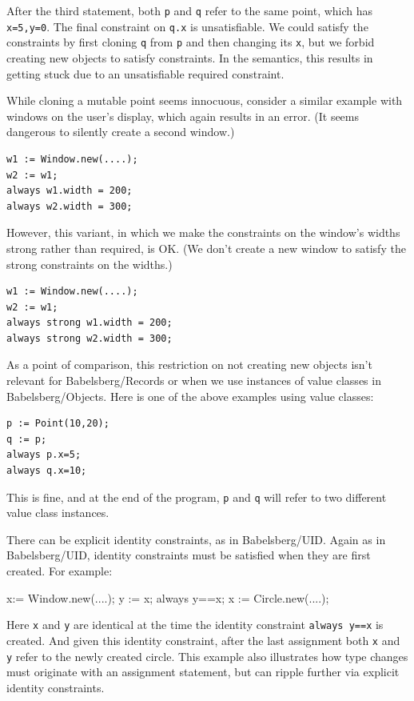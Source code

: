 \documentclass{article}
\newcounter{examples}
\begin{document}
After the third statement, both \verb|p| and \verb|q| refer to the
same point, which has \verb|x=5,y=0|.  The final constraint on 
\verb|q.x| is unsatisfiable.  We could satisfy the constraints by
first cloning \verb|q| from \verb|p| and then changing its \verb|x|,
but we forbid creating new objects to satisfy constraints.  In the
semantics, this results in getting stuck due to an unsatisfiable
required constraint.

While cloning a mutable point seems innocuous, consider a similar example with
windows on the user's display, which again results in an error.  (It
seems dangerous to silently create a second window.)

\begin{verbatim}
w1 := Window.new(....);
w2 := w1;
always w1.width = 200;
always w2.width = 300;
\end{verbatim}

However, this variant, in which we make the constraints on the
window's widths strong rather than required, is OK.  (We don't create
a new window to satisfy the strong constraints on the widths.)

\begin{verbatim}
w1 := Window.new(....);
w2 := w1;
always strong w1.width = 200;
always strong w2.width = 300;
\end{verbatim}

As a point of comparison, this restriction on not creating new objects
isn't relevant for Babelsberg/Records or when we use instances of
value classes in Babelsberg/Objects.
Here is one of the above examples using value classes:

\begin{verbatim}
p := Point(10,20);
q := p;
always p.x=5;
always q.x=10;
\end{verbatim}

This is fine, and at the end of the program, \verb|p| and \verb|q|
will refer to two different value class instances.

There can be explicit identity constraints, as in Babelsberg/UID\@.
Again as in Babelsberg/UID, identity constraints must be satisfied
when they are first created.  For example:
\begin{example}
x:= Window.new(....);
y := x;
always y==x;
x := Circle.new(....);
\end{example}

Here \verb|x| and \verb|y| are identical at the time the identity
constraint \verb|always y==x| is created.  And given this identity
constraint, after the last assignment both \verb|x| and \verb|y| refer
to the newly created circle.  This example also illustrates how type
changes must originate with an assignment statement, but can ripple
further via explicit identity constraints.
\end{document}
